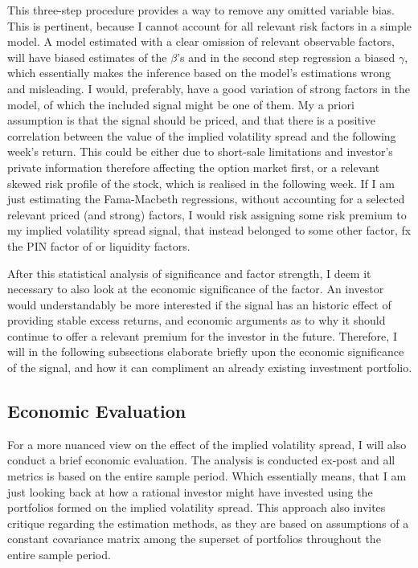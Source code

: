 This three-step procedure provides a way to remove any omitted variable bias. This is pertinent, because I cannot account for all relevant risk factors in a simple model. A model estimated with a clear omission of relevant observable factors, will have biased estimates of the $\beta$'s and in the second step regression a biased $\gamma$, which essentially makes the inference based on the model's estimations wrong and misleading. I would, preferably, have a good variation of strong factors in the model, of which the included signal might be one of them. My a priori assumption is that the signal should be priced, and that there is a positive correlation between the value of the implied volatility spread and the following week's return. This could be either due to short-sale limitations and investor's private information therefore affecting the option market first, or a relevant skewed risk profile of the stock, which is realised in the following week. If I am just estimating the Fama-Macbeth regressions,  without accounting for a selected relevant priced (and strong) factors, I would risk assigning some risk premium to my implied volatility spread signal, that instead belonged to some other factor, fx the PIN factor of \cite{pan2006information} or liquidity factors.

After this statistical analysis of significance and factor strength, I deem it necessary to also look at the economic significance of the factor. An investor would understandably be more interested if the signal has an historic effect of providing stable excess returns, and economic arguments as to why it should continue to offer a relevant premium for the investor in the future. Therefore, I will in the following subsections elaborate briefly upon the economic significance of the signal, and how it can compliment an already existing investment portfolio.

\subsection{Economic Evaluation}

For a more nuanced view on the effect of the implied volatility spread, I will also conduct a brief economic evaluation. The analysis is conducted ex-post and all metrics is based on the entire sample period. Which essentially means, that I am just looking back at how a rational investor might have invested using the portfolios formed on the implied volatility spread. This approach also invites critique regarding the estimation methods, as they are based on assumptions of a constant covariance matrix among the superset of portfolios throughout the entire sample period.

